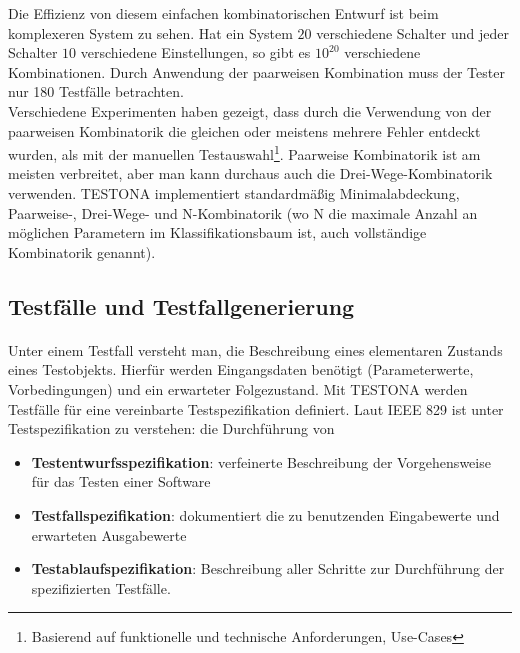 Die Effizienz von diesem einfachen kombinatorischen Entwurf ist beim komplexeren System zu sehen. Hat ein System $20$ verschiedene Schalter und jeder Schalter $10$ verschiedene Einstellungen, so gibt es $10^{20}$ verschiedene Kombinationen. Durch Anwendung der paarweisen Kombination muss der Tester nur 180 Testfälle betrachten.\\

Verschiedene Experimenten haben gezeigt, dass durch die Verwendung von der paarweisen Kombinatorik die gleichen oder meistens mehrere Fehler entdeckt wurden, als mit der manuellen Testauswahl\footnote{Basierend auf funktionelle und technische Anforderungen, Use-Cases}. Paarweise Kombinatorik ist am meisten verbreitet, aber man kann durchaus auch die Drei-Wege-Kombinatorik verwenden. TESTONA implementiert standardmäßig Minimalabdeckung, Paarweise-, Drei-Wege- und N-Kombinatorik (wo N die maximale Anzahl an möglichen Parametern im Klassifikationsbaum ist, auch vollständige Kombinatorik genannt)\cite{CombinatorialSoftTesting}.\\




\subsection{Testfälle und Testfallgenerierung}
\paragraph{}

Unter einem Testfall versteht man, die Beschreibung eines elementaren Zustands eines Testobjekts. Hierfür werden Eingangsdaten benötigt (Parameterwerte, Vorbedingungen) und ein erwarteter Folgezustand. Mit TESTONA werden Testfälle für eine vereinbarte Testspezifikation definiert. Laut IEEE 829 ist unter Testspezifikation zu verstehen: die Durchführung von

\begin{itemize}
\item\textbf{ Testentwurfsspezifikation}: verfeinerte Beschreibung der Vorgehensweise für das Testen einer Software
\item \textbf{Testfallspezifikation}: dokumentiert die zu benutzenden Eingabewerte und erwarteten Ausgabewerte
\item \textbf{Testablaufspezifikation}: Beschreibung aller Schritte zur Durchführung der spezifizierten Testfälle.
\end{itemize}

